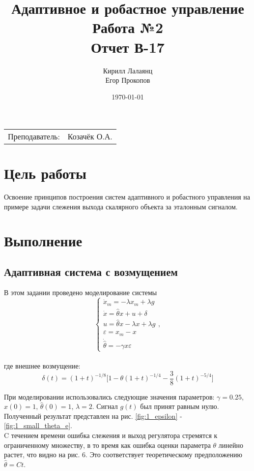 \documentclass{article}
\title{Адаптивное и робастное управление \\ Работа №2 \\ Отчет В-17} %
\author{Кирилл Лалаянц \\ Егор Прокопов} %
\date{\today} %
\begin{document}
\maketitle %

\begin{center}
\begin{tabular}{l r}
Преподаватель: & Козачёк О.А. %
\end{tabular}
\end{center}
\newpage

\section{Цель работы}

Освоение принципов построения систем адаптивного и 
робастного управления на примере задачи слежения выхода скалярного 
объекта за эталонным сигналом.


\section{Выполнение}
\subsection{Адаптивная система с возмущением}
В этом задании проведено моделирование системы 
\[
\begin{cases}
    \dot x_m = -\lambda x_m + \lambda g    \\
    \dot x = \hat \theta x + u + \delta\\
    u = \hat \theta x - \lambda x + \lambda g \\
    \varepsilon = x_m - x \\ 
    \dot {\hat \theta} = -\gamma x \varepsilon
\end{cases},
\] \\
где внешнее возмущение:
$$
    \delta(t) = (1 + t)^{-1/8}\Big[1 - \theta(1+t)^{-1/4} - \dfrac{3}{8}(1+t)^{-5/4}\Big]
$$

При моделировании использовались следующие значения параметров: $\gamma = 0.25$, $x(0) = 1$, $\hat \theta(0) = 1$, $\lambda = 2$. Сигнал $g(t)$ был принят равным нулю. Полученный результат представлен на рис. \ref{fig:1_epsilon} - \ref{fig:1_small_theta_e}. \\
C течением времени ошибка слежения и выход регулятора стремятся к ограниченному множеству, в то время как ошибка оценки параметра $\theta$ линейно растет, что видно на рис. 6. Это соответствует теоретическому предположению $\hat \theta = Ct$.
\end{document}
